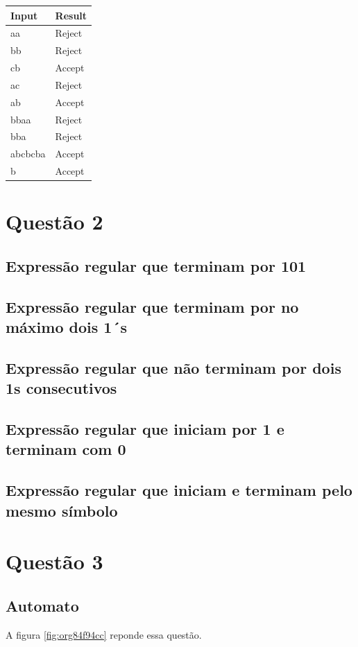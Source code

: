 \documentclass[11pt]{article}
\begin{document}
\begin{center}
\begin{tabular}{ll}
Input & Result\\
\hline
aa & Reject\\
bb & Reject\\
cb & Accept\\
ac & Reject\\
ab & Accept\\
bbaa & Reject\\
bba & Reject\\
abcbcba & Accept\\
b & Accept\\
\end{tabular}
\end{center}

\section{Questão 2}
\label{sec:orgcedcb85}

\subsection{Expressão regular que terminam por 101}
\label{sec:org2679676}
\subsection{Expressão regular que terminam por no máximo dois 1´s}
\label{sec:org83d8d5c}
\subsection{Expressão regular que não terminam por dois 1s consecutivos}
\label{sec:orga71d152}
\subsection{Expressão regular que iniciam por 1 e terminam com 0}
\label{sec:org7441f6e}
\subsection{Expressão regular que iniciam e terminam pelo mesmo símbolo}
\label{sec:orgb86929a}

\section{Questão 3}
\label{sec:org55955a1}
\subsection{Automato}
\label{sec:orga4cadfe}
A figura \ref{fig:org84f94cc} reponde essa questão. 
\end{document}
